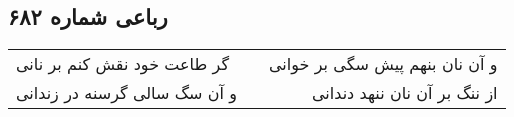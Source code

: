 \begin{center}
\section*{رباعی شماره ۶۸۲}
\label{sec:sh682}
\begin{longtable}{l p{0.5cm} r}
گر طاعت خود نقش کنم بر نانی
&&
و آن نان بنهم پیش سگی بر خوانی
\\
و آن سگ سالی گرسنه در زندانی
&&
از ننگ بر آن نان ننهد دندانی
\\
\end{longtable}
\end{center}

